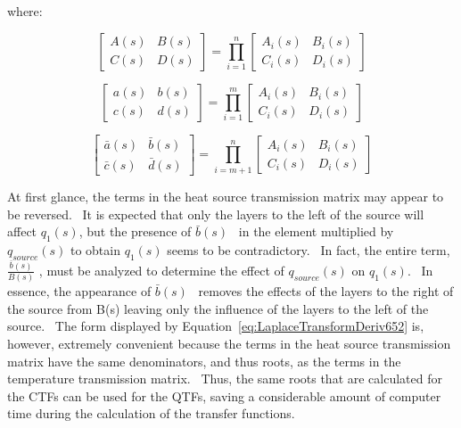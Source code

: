 where:

\begin{equation}
\left[ {\begin{array}{ccc}{A\left( s \right)}&{B\left( s \right)}\\ {C\left( s \right)}&{D\left( s \right)}\end{array}} \right] = \prod\limits_{i = 1}^n {\left[ {\begin{array}{ccc}{{A_i}\left( s \right)}&{{B_i}\left( s \right)}\\ {{C_i}\left( s \right)}&{{D_i}\left( s \right)}\end{array}} \right]}
\end{equation}

\begin{equation}
\left[ {\begin{array}{ccc}{a\left( s \right)}&{b\left( s \right)}\\ {c\left( s \right)}&{d\left( s \right)}\end{array}} \right] = \prod\limits_{i = 1}^m {\left[ {\begin{array}{ccc}{{A_i}\left( s \right)}&{{B_i}\left( s \right)}\\ {{C_i}\left( s \right)}&{{D_i}\left( s \right)}\end{array}} \right]}
\end{equation}

\begin{equation}
\left[ {\begin{array}{ccc}{\bar a\left( s \right)}&{\bar b\left( s \right)}\\ {\bar c\left( s \right)}&{\bar d\left( s \right)}\end{array}} \right] = \prod\limits_{i = m + 1}^n {\left[ {\begin{array}{ccc}{{A_i}\left( s \right)}&{{B_i}\left( s \right)}\\ {{C_i}\left( s \right)}&{{D_i}\left( s \right)}\end{array}} \right]}
\end{equation}

At first glance, the terms in the heat source transmission matrix may appear to be reversed.~ It is expected that only the layers to the left of the source will affect \(q_1(s)\), but the presence of \(\bar b\left( s \right)\) ~in the element multiplied by \(q_{source}(s)\) to obtain \(q_1(s)\) seems to be contradictory.~ In fact, the entire term, \({\frac{{\bar b\left( s \right)}}{B\left( s \right)}}\) , must be analyzed to determine the effect of \(q_{source}(s)\) on \(q_1(s)\).~ In essence, the appearance of \(\bar b\left( s \right)\) ~removes the effects of the layers to the right of the source from B(s) leaving only the influence of the layers to the left of the source.~ The form displayed by Equation~\ref{eq:LaplaceTransformDeriv652} is, however, extremely convenient because the terms in the heat source transmission matrix have the same denominators, and thus roots, as the terms in the temperature transmission matrix.~ Thus, the same roots that are calculated for the CTFs can be used for the QTFs, saving a considerable amount of computer time during the calculation of the transfer functions.

